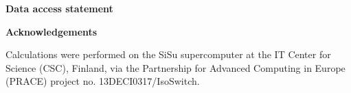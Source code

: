 \textbf{Data access statement}

\textbf{Acknowledgements}

Calculations were performed on the SiSu supercomputer at the IT Center for Science (CSC), Finland, via the Partnership for Advanced Computing in Europe (PRACE) project no. 13DECI0317/IsoSwitch.
